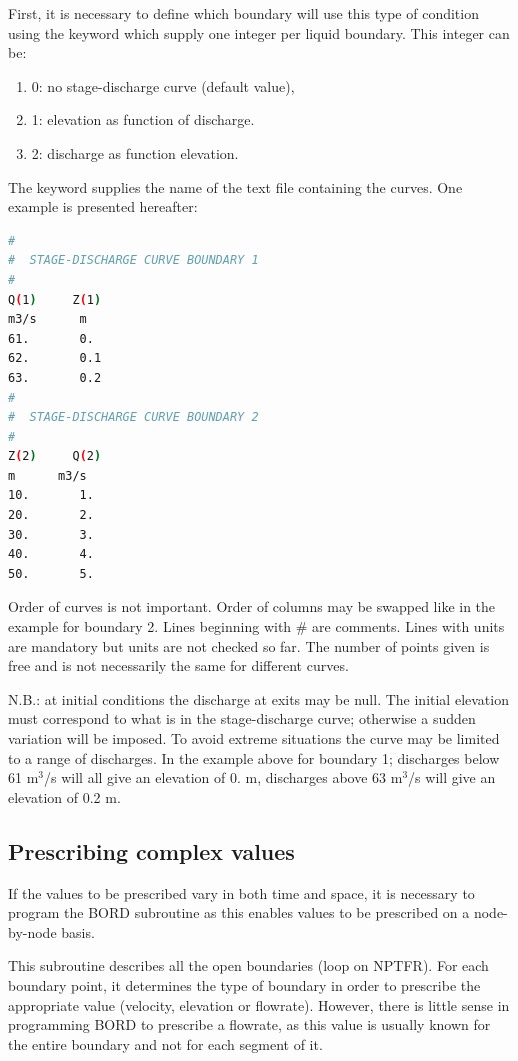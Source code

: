  First, it is necessary to define which boundary will use this type of condition using the keyword  which supply one integer per liquid boundary. This integer can be:

\begin{enumerate}
\item [\nonumber] 0: no stage-discharge curve (default value),

\item [\nonumber] 1: elevation as function of discharge.

\item [\nonumber] 2: discharge as function elevation.
\end{enumerate}

 The keyword  supplies the name of the text file containing the curves. One example is presented hereafter:
\begin{lstlisting}[language=bash]
#
#  STAGE-DISCHARGE CURVE BOUNDARY 1
#
Q(1)     Z(1)
m3/s      m
61.       0.
62.       0.1
63.       0.2
#
#  STAGE-DISCHARGE CURVE BOUNDARY 2
#
Z(2)     Q(2)
m      m3/s
10.       1.
20.       2.
30.       3.
40.       4.
50.       5.
\end{lstlisting} 
Order of curves is not important. Order of columns may be swapped like in the example for boundary 2. Lines beginning with \# are comments. Lines with units are mandatory but units are not checked so far. The number of points given is free and is not necessarily the same for different curves.

 N.B.: at initial conditions the discharge at exits may be null. The initial elevation must correspond to what is in the stage-discharge curve; otherwise a sudden variation will be imposed. To avoid extreme situations the curve may be limited to a range of discharges. In the example above for boundary 1; discharges below 61 m${}^{3}$/s will all give an elevation of 0. m, discharges above 63 m${}^{3}$/s will give an elevation of 0.2 m.


\subsection{ Prescribing complex values}
\label{subs:pres:compl:val}
 If the values to be prescribed vary in both time and space, it is necessary to program the BORD subroutine as this enables values to be prescribed on a node-by-node basis.

 This subroutine describes all the open boundaries (loop on NPTFR). For each boundary point, it determines the type of boundary in order to prescribe the appropriate value (velocity, elevation or flowrate). However, there is little sense in programming BORD to prescribe a flowrate, as this value is usually known for the entire boundary and not for each segment of it.

